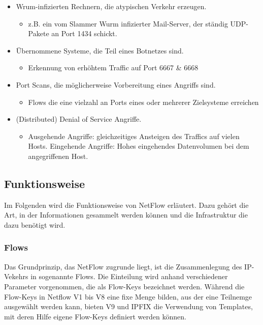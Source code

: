 \begin{itemize}
  \item Wrum-infizierten Rechnern, die atypischen Verkehr erzeugen.
  \begin{itemize}
    \item z.B. ein vom Slammer Wurm infizierter Mail-Server, der ständig
UDP-Pakete an Port 1434 schickt.
  \end{itemize}
  \item Übernommene Systeme, die Teil eines Botnetzes sind.
  \begin{itemize}
    \item Erkennung von erhöhtem Traffic auf Port 6667 \& 6668
  \end{itemize}
  \item Port Scans, die möglicherweise Vorbereitung eines Angriffs sind.
  \begin{itemize}
    \item Flows die eine vielzahl an Ports eines oder mehrerer Zielsysteme
erreichen
  \end{itemize}
  \item (Distributed) Denial of Service Angriffe.
  \begin{itemize}
    \item Ausgehende Angriffe: gleichzeitiges Ansteigen des Traffics auf vielen
Hosts. Eingehende Angriffe: Hohes eingehendes Datenvolumen bei dem angegriffenen
Host.
  \end{itemize}
\end{itemize}

\subsection{Funktionsweise}

Im Folgenden wird die Funktionsweise von NetFlow erläutert. Dazu gehört die Art,
in der Informationen gesammelt werden können und die Infrastruktur die dazu
benötigt wird.

\subsubsection{Flows}

Das Grundprinzip, das NetFlow zugrunde liegt, ist die Zusammenlegung des
IP-Vekehrs in sogenannte Flows. Die Einteilung wird anhand verschiedener
Parameter vorgenommen, die als Flow-Keys bezeichnet werden. Während die
Flow-Keys in Netflow V1 bis V8 eine fixe Menge bilden, aus der eine Teilnemge
ausgewählt werden kann, bieten V9 und IPFIX die Verwendung von Templates, mit
deren Hilfe eigene Flow-Keys definiert werden können.

